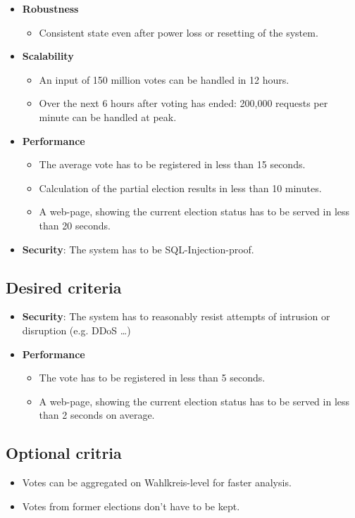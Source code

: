 \documentclass[10pt,a4paper]{article}
\begin{document}
\begin{itemize}
		\item \textbf{Robustness}
			\begin{itemize}
				\item Consistent state even after power loss or resetting of the system.
			\end{itemize}
			

		\item \textbf{Scalability}
			\begin{itemize}
				\item An input of 150 million votes can be handled in 12 hours.
				\item Over the next 6 hours after voting has ended: 200,000 requests per minute can be handled at peak. 
			\end{itemize} 
			
		\item \textbf{Performance}
			\begin{itemize}
				\item The average vote has to be registered in less than 15 seconds.
				\item Calculation of the partial election results in less than 10 minutes.
				\item A web-page, showing the current election status has to be served in less than 20 seconds.
			\end{itemize}
			
		\item \textbf{Security}: The system has to be SQL-Injection-proof.
	\end{itemize}
\subsection{Desired criteria}
	\begin{itemize}
		\item \textbf{Security}: The system has to reasonably resist attempts of intrusion or disruption (e.g. DDoS \dots)
		
		\item \textbf{Performance}
			\begin{itemize}
				\item The vote has to be registered in less than 5 seconds.
				\item A web-page, showing the current election status has to be served in less than 2 seconds on average.
			\end{itemize}
	\end{itemize}
\subsection{Optional critria}
	\begin{itemize}
		\item Votes can be aggregated on Wahlkreis-level for faster analysis.
		\item Votes from former elections don't have to be kept.
	\end{itemize}
\end{document}
